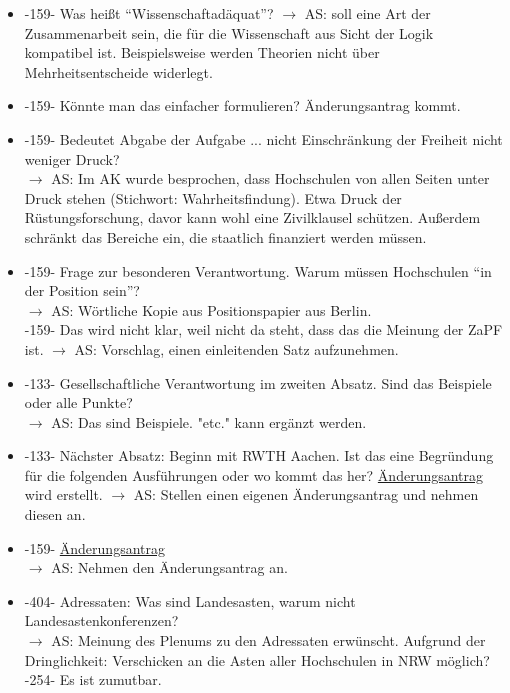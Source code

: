    \begin{itemize}
      \item -159- Was heißt ``Wissenschaftadäquat''?
        $\rightarrow$ AS: soll eine Art der Zusammenarbeit sein, die für die Wissenschaft aus Sicht der Logik kompatibel ist. Beispielsweise werden Theorien nicht über Mehrheitsentscheide widerlegt.
      \item -159- Könnte man das einfacher formulieren? Änderungsantrag kommt.
      \item -159- Bedeutet Abgabe der Aufgabe ... nicht Einschränkung der Freiheit nicht weniger Druck? \\
        $\rightarrow$ AS: Im AK wurde besprochen, dass Hochschulen von allen Seiten unter Druck stehen (Stichwort: Wahrheitsfindung). Etwa Druck der Rüstungsforschung, davor kann wohl eine Zivilklausel schützen. Außerdem schränkt das Bereiche ein, die staatlich finanziert werden müssen.
      \item -159- Frage zur besonderen Verantwortung. Warum müssen Hochschulen ``in der Position sein''? \\
        $\rightarrow$ AS: Wörtliche Kopie aus Positionspapier aus Berlin. \\
        -159- Das wird nicht klar, weil nicht da steht, dass das die Meinung der ZaPF ist.
        $\rightarrow$ AS: Vorschlag, einen einleitenden Satz aufzunehmen.
      \item -133- Gesellschaftliche Verantwortung im zweiten Absatz. Sind das Beispiele oder alle Punkte? \\
        $\rightarrow$ AS: Das sind Beispiele. "etc." kann ergänzt werden.
      \item -133- Nächster Absatz: Beginn mit RWTH Aachen. Ist das eine Begründung für die folgenden Ausführungen oder wo kommt das her? \underline{Änderungsantrag} wird erstellt.
        $\rightarrow$ AS: Stellen einen eigenen Änderungsantrag und nehmen diesen an.
      \item -159- \underline{Änderungsantrag} \\
        $\rightarrow$ AS: Nehmen den Änderungsantrag an.
      \item -404- Adressaten: Was sind Landesasten, warum nicht Landesastenkonferenzen? \\
        $\rightarrow$ AS: Meinung des Plenums zu den Adressaten erwünscht. Aufgrund der Dringlichkeit: Verschicken an die Asten aller Hochschulen in NRW möglich? \\
        -254- Es ist zumutbar. \\

\end{itemize}
